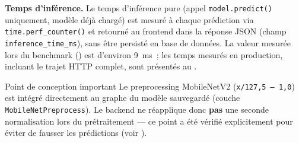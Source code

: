 \textbf{Temps d'inf\'erence.} Le temps d'inf\'erence pure (appel \texttt{model.predict()} uniquement, mod\`ele d\'ej\`a charg\'e) est mesur\'e \`a chaque pr\'ediction via \texttt{time.perf\_counter()} et retourn\'e au frontend dans la r\'eponse JSON (champ \texttt{inference\_time\_ms}), sans \^etre persist\'e en base de donn\'ees. La valeur mesur\'ee lors du benchmark () est d'environ 9~ms~; les temps mesur\'es en production, incluant le trajet HTTP complet, sont pr\'esent\'es au .

\begin{noteflag}{Point de conception important}
Le preprocessing MobileNetV2 (\texttt{x/127,5 -- 1,0}) est int\'egr\'e directement au graphe du mod\`ele sauvegard\'e (couche \texttt{MobileNetPreprocess}). Le backend ne r\'eapplique donc \textbf{pas} une seconde normalisation lors du pr\'etraitement --- ce point a \'et\'e v\'erifi\'e explicitement pour \'eviter de fausser les pr\'edictions (voir ).
\end{noteflag}

